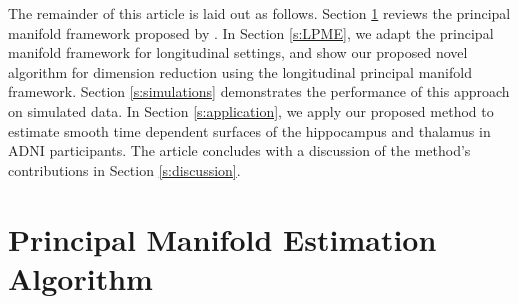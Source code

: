 \documentclass[12pt]{article}
\theoremstyle{definition}
\begin{document}
The remainder of this article is laid out as follows. Section \ref{s:PME} reviews the principal manifold framework proposed by \cite{meng2021Principal}. In Section \ref{s:LPME}, we adapt the principal manifold framework for longitudinal settings, and show our proposed novel algorithm for dimension reduction using the longitudinal principal manifold framework. Section \ref{s:simulations} demonstrates the performance of this approach on simulated data. In Section \ref{s:application}, we apply our proposed method to estimate smooth time dependent surfaces of the hippocampus and thalamus in ADNI participants. The article concludes with a discussion of the method's contributions in Section \ref{s:discussion}.








\section{Principal Manifold Estimation Algorithm}\label{s:PME}
\end{document}
